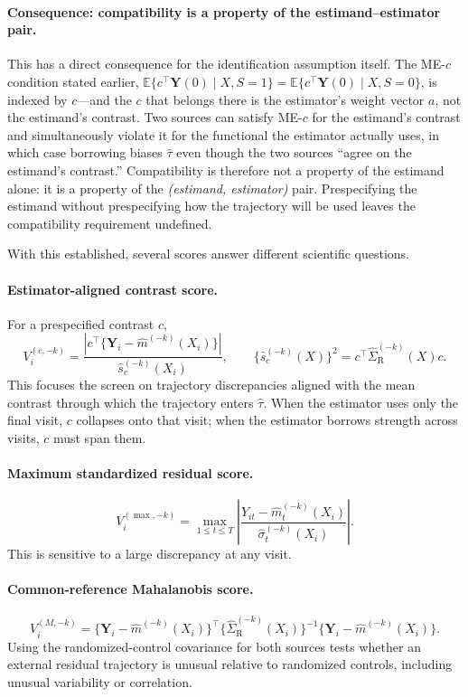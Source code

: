 \documentclass[11pt]{article}
\newcommand{\R}{\mathrm{R}}
\newcommand{\Exp}{\mathbb{E}}
\begin{document}
\paragraph{Consequence: compatibility is a property of the estimand--estimator pair.}
This has a direct consequence for the identification assumption itself. The ME-$c$ condition stated earlier,
$\Exp\{c^{\top}\bm Y(0)\mid X,S=1\}=\Exp\{c^{\top}\bm Y(0)\mid X,S=0\}$,
is indexed by $c$---and the $c$ that belongs there is the estimator's weight vector $a$, not the estimand's contrast. Two sources can satisfy ME-$c$ for the estimand's contrast and simultaneously violate it for the functional the estimator actually uses, in which case borrowing biases $\widehat\tau$ even though the two sources ``agree on the estimand's contrast.'' Compatibility is therefore not a property of the estimand alone: it is a property of the \emph{(estimand, estimator)} pair. Prespecifying the estimand without prespecifying how the trajectory will be used leaves the compatibility requirement undefined.

With this established, several scores answer different scientific questions.

\paragraph{Estimator-aligned contrast score.}
For a prespecified contrast $c$,
\[
V_i^{(c,-k)}
=
\frac{\left|c^{\top}\{\bm Y_i-\widehat m^{(-k)}(X_i)\}\right|}
{\widehat s_c^{(-k)}(X_i)},
\qquad
\{\widehat s_c^{(-k)}(X)\}^2
=c^{\top}\widehat\Sigma_{\R}^{(-k)}(X)c.
\tag{3}
\]
This focuses the screen on trajectory discrepancies aligned with the mean contrast through which the trajectory enters $\widehat\tau$. When the estimator uses only the final visit, $c$ collapses onto that visit; when the estimator borrows strength across visits, $c$ must span them.

\paragraph{Maximum standardized residual score.}
\[
V_i^{(\max,-k)}
=
\max_{1\le t\le T}
\left|
\frac{Y_{it}-\widehat m_t^{(-k)}(X_i)}
{\widehat\sigma_t^{(-k)}(X_i)}
\right|.
\tag{4}
\]
This is sensitive to a large discrepancy at any visit.

\paragraph{Common-reference Mahalanobis score.}
\[
V_i^{(M,-k)}
=
\{\bm Y_i-\widehat m^{(-k)}(X_i)\}^{\top}
\{\widehat\Sigma_{\R}^{(-k)}(X_i)\}^{-1}
\{\bm Y_i-\widehat m^{(-k)}(X_i)\}.
\tag{5}
\]
Using the randomized-control covariance for both sources tests whether an external residual trajectory is unusual relative to randomized controls, including unusual variability or correlation.
\end{document}
